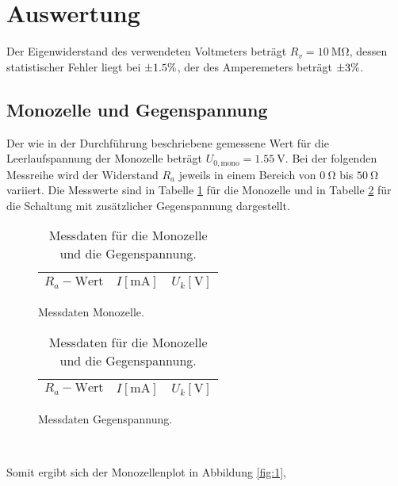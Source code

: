\section{Auswertung}
\label{sec:Auswertung}
Der Eigenwiderstand des verwendeten Voltmeters beträgt $R_v=\SI{10}{\mega\ohm}$, dessen statistischer Fehler liegt bei $\num{+-1.5}\%$, der des Amperemeters beträgt $\num{+-3}\%$.
\subsection{Monozelle und Gegenspannung}
\label{ch:auswertung}
Der wie in der Durchführung beschriebene gemessene Wert für die Leerlaufspannung der Monozelle beträgt $U_{0,\text{mono}} = \SI{1.55}{\volt}$.
Bei der folgenden Messreihe wird der Widerstand $R_a$ jeweils in einem Bereich von $\SI{0}{\ohm}$ bis $\SI{50}{\ohm}$ variiert.
Die Messwerte sind in Tabelle \ref{tab:1} für die Monozelle und in Tabelle \ref{tab:2} für die Schaltung mit zusätzlicher Gegenspannung dargestellt.
\begin{table}
  \hspace*{\fill}
  \begin{subfigure}{0.40\textwidth}
  \centering
  \caption{Messdaten Monozelle.}
  \label{tab:1}
  \begin{tabular}{c c c}
    \toprule
    {$R_a-\text{Wert}$} & {$I [\si{\milli\ampere}]$} & {$U_k [\si{\volt}]$} \\
    \midrule
    
    \bottomrule
  \end{tabular}
\end{subfigure}
\hspace*{\fill}
\begin{subfigure}{0.40\textwidth}
  \centering
  \caption{Messdaten Gegenspannung.}
  \label{tab:2}
  \begin{tabular}{c c c}
    \toprule
    {$R_a-\text{Wert}$} & {$I [\si{\milli\ampere}]$} & {$U_k [\si{\volt}]$} \\
    \midrule
    
    \bottomrule
  \end{tabular}
\end{subfigure}
\\
\hspace*{\fill}
\hspace*{\fill}
\caption{Messdaten für die Monozelle und die Gegenspannung.}
\end{table}

Somit ergibt sich der Monozellenplot in Abbildung \ref{fig:1},


